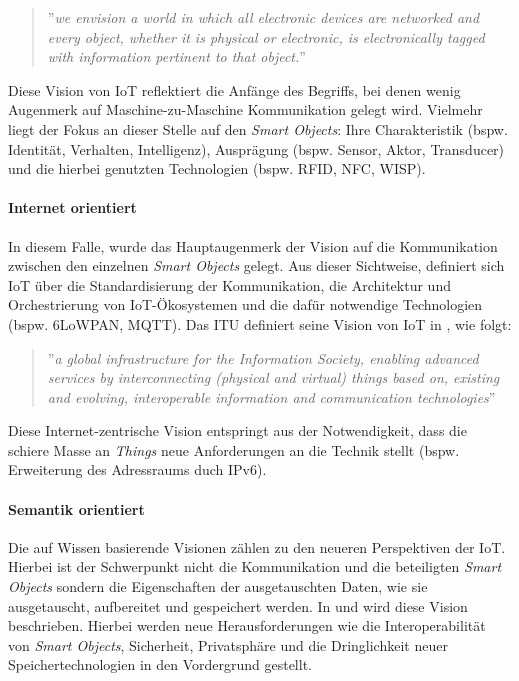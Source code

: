 \begin{quote}
    ''\textit{we envision a world in which all electronic devices are networked and every object, whether it is physical or electronic, is electronically tagged with information pertinent to that object.}''
\end{quote}

Diese Vision von \ac{IoT} reflektiert die Anfänge des Begriffs, bei denen wenig Augenmerk auf Maschine-zu-Maschine Kommunikation gelegt wird. Vielmehr liegt der Fokus an dieser Stelle auf den \textit{Smart Objects}: Ihre Charakteristik (bspw. Identität, Verhalten, Intelligenz), Ausprägung (bspw. Sensor, Aktor, Transducer) und die hierbei genutzten Technologien (bspw. RFID, NFC, WISP).

\paragraph{Internet orientiert} In diesem Falle, wurde das Hauptaugenmerk der Vision auf die Kommunikation zwischen den einzelnen \textit{Smart Objects} gelegt. Aus dieser Sichtweise, definiert sich \ac{IoT} über die Standardisierung der Kommunikation, die Architektur und Orchestrierung von \ac{IoT}-Ökosystemen und die dafür notwendige Technologien (bspw. 6LoWPAN, MQTT). Das \ac{ITU} definiert seine Vision von \ac{IoT} in \cite{itut2012}, wie folgt: 

\begin{quote}
''\textit{a global infrastructure for the Information Society, enabling advanced services by interconnecting (physical and virtual) things based on, existing and evolving, interoperable information and communication technologies}''
\end{quote}

Diese Internet-zentrische Vision entspringt aus der Notwendigkeit, dass die schiere Masse an \textit{Things} neue Anforderungen an die Technik stellt (bspw. Erweiterung des Adressraums duch IPv6). 

\paragraph{Semantik orientiert} Die auf Wissen basierende Visionen zählen zu den neueren Perspektiven der \ac{IoT}. Hierbei ist der Schwerpunkt nicht die Kommunikation und die beteiligten \textit{Smart Objects} sondern die Eigenschaften der ausgetauschten Daten, wie sie ausgetauscht, aufbereitet und gespeichert werden. In \cite{Kotis2012} und \cite{Singh2014} wird diese Vision beschrieben. Hierbei werden neue Herausforderungen wie die Interoperabilität von \textit{Smart Objects}, Sicherheit, Privatsphäre \cite{weber2010internet} und die Dringlichkeit neuer Speichertechnologien in den Vordergrund gestellt.

